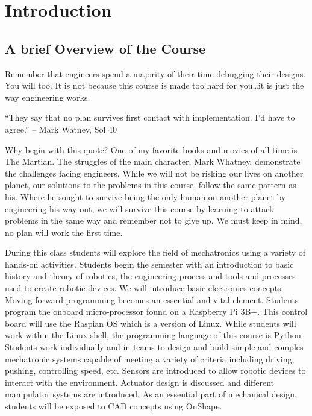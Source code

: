\documentclass[
]{book}
\begin{document}
\hypertarget{intro}{%
\chapter{Introduction}\label{intro}}

\hypertarget{a-brief-overview-of-the-course}{%
\section{A brief Overview of the Course}\label{a-brief-overview-of-the-course}}

Remember that engineers spend a majority of their time debugging their designs. You will too. It is not because this course is made too hard for you\ldots it is just the way engineering works.

``They say that no plan survives first contact with implementation. I'd have to agree.'' -- Mark Watney, Sol 40

Why begin with this quote? One of my favorite books and movies of all time is The Martian. The struggles of the main character, Mark Whatney, demonstrate the challenges facing engineers. While we will not be risking our lives on another planet, our solutions to the problems in this course, follow the same pattern as his. Where he sought to survive being the only human on another planet by engineering his way out, we will survive this course by learning to attack problems in the same way and remember not to give up. We must keep in mind, no plan will work the first time.

During this class students will explore the field of mechatronics using a variety of hands-on activities. Students begin the semester with an introduction to basic history and theory of robotics, the engineering process and tools and processes used to create robotic devices. We will introduce basic electronics concepts. Moving forward programming becomes an essential and vital element. Students program the onboard micro-processor found on a Raspberry Pi 3B+. This control board will use the Raspian OS which is a version of Linux. While students will work within the Linux shell, the programming language of this course is Python. Students work individually and in teams to design and build simple and comples mechatronic systems capable of meeting a variety of criteria including driving, pushing, controlling speed, etc. Sensors are introduced to allow robotic devices to interact with the environment. Actuator design is discussed and different manipulator systems are introduced. As an essential part of mechanical design, students will be exposed to CAD concepts using OnShape.
\end{document}
